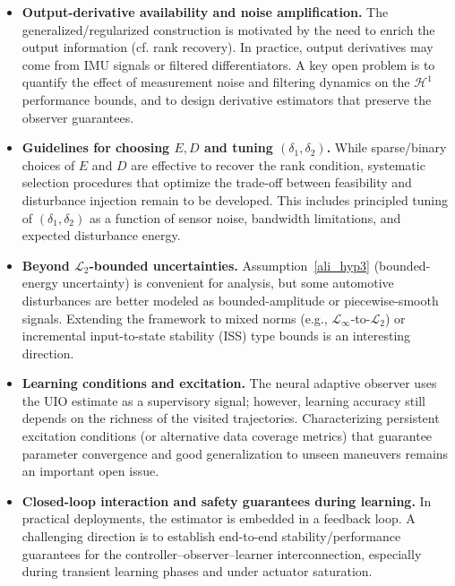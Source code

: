 \begin{itemize}
    \item \textbf{Output-derivative availability and noise amplification.} The generalized/regularized construction is motivated by the need to enrich the output information (cf. rank recovery). In practice, output derivatives may come from IMU signals or filtered differentiators. A key open problem is to quantify the effect of measurement noise and filtering dynamics on the $\mathcal{H}^{1}$ performance bounds, and to design derivative estimators that preserve the observer guarantees.

    \item \textbf{Guidelines for choosing $E,D$ and tuning $(\delta_1,\delta_2)$.} While sparse/binary choices of $E$ and $D$ are effective to recover the rank condition, systematic selection procedures that optimize the trade-off between feasibility and disturbance injection remain to be developed. This includes principled tuning of $(\delta_1,\delta_2)$ as a function of sensor noise, bandwidth limitations, and expected disturbance energy.

    \item \textbf{Beyond $\mathcal{L}_2$-bounded uncertainties.} Assumption~\ref{ali_hyp3} (bounded-energy uncertainty) is convenient for analysis, but some automotive disturbances are better modeled as bounded-amplitude or piecewise-smooth signals. Extending the framework to mixed norms (e.g., $\mathcal{L}_\infty$-to-$\mathcal{L}_2$) or incremental input-to-state stability (ISS) type bounds is an interesting direction.

    \item \textbf{Learning conditions and excitation.} The neural adaptive observer uses the UIO estimate as a supervisory signal; however, learning accuracy still depends on the richness of the visited trajectories. Characterizing persistent excitation conditions (or alternative data coverage metrics) that guarantee parameter convergence and good generalization to unseen maneuvers remains an important open issue.

    \item \textbf{Closed-loop interaction and safety guarantees during learning.} In practical deployments, the estimator is embedded in a feedback loop. A challenging direction is to establish end-to-end stability/performance guarantees for the controller--observer--learner interconnection, especially during transient learning phases and under actuator saturation.


\end{itemize}
